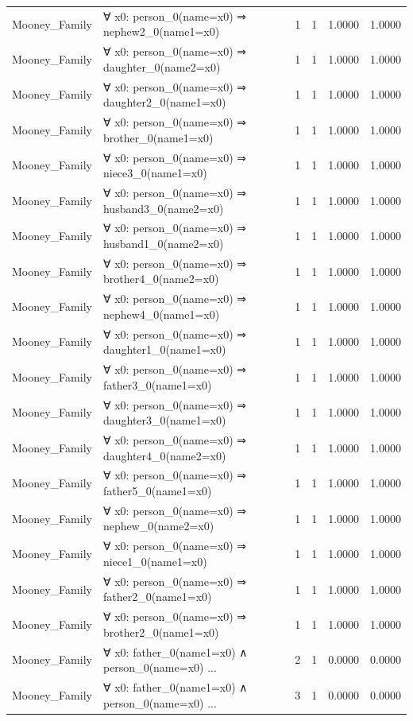 \documentclass[11pt,a4paper]{article}
\begin{document}
\begin{table}[h!]
\begin{longtable}{|l|p{6cm}|c|c|c|c|}
Mooney_Family & ∀ x0: person\_0(name=x0) ⇒ nephew2\_0(name1=x0) & 1 & 1 & 1.0000 & 1.0000 \\
Mooney_Family & ∀ x0: person\_0(name=x0) ⇒ daughter\_0(name2=x0) & 1 & 1 & 1.0000 & 1.0000 \\
Mooney_Family & ∀ x0: person\_0(name=x0) ⇒ daughter2\_0(name1=x0) & 1 & 1 & 1.0000 & 1.0000 \\
Mooney_Family & ∀ x0: person\_0(name=x0) ⇒ brother\_0(name1=x0) & 1 & 1 & 1.0000 & 1.0000 \\
Mooney_Family & ∀ x0: person\_0(name=x0) ⇒ niece3\_0(name1=x0) & 1 & 1 & 1.0000 & 1.0000 \\
Mooney_Family & ∀ x0: person\_0(name=x0) ⇒ husband3\_0(name2=x0) & 1 & 1 & 1.0000 & 1.0000 \\
Mooney_Family & ∀ x0: person\_0(name=x0) ⇒ husband1\_0(name2=x0) & 1 & 1 & 1.0000 & 1.0000 \\
Mooney_Family & ∀ x0: person\_0(name=x0) ⇒ brother4\_0(name2=x0) & 1 & 1 & 1.0000 & 1.0000 \\
Mooney_Family & ∀ x0: person\_0(name=x0) ⇒ nephew4\_0(name1=x0) & 1 & 1 & 1.0000 & 1.0000 \\
Mooney_Family & ∀ x0: person\_0(name=x0) ⇒ daughter1\_0(name1=x0) & 1 & 1 & 1.0000 & 1.0000 \\
Mooney_Family & ∀ x0: person\_0(name=x0) ⇒ father3\_0(name1=x0) & 1 & 1 & 1.0000 & 1.0000 \\
Mooney_Family & ∀ x0: person\_0(name=x0) ⇒ daughter3\_0(name1=x0) & 1 & 1 & 1.0000 & 1.0000 \\
Mooney_Family & ∀ x0: person\_0(name=x0) ⇒ daughter4\_0(name2=x0) & 1 & 1 & 1.0000 & 1.0000 \\
Mooney_Family & ∀ x0: person\_0(name=x0) ⇒ father5\_0(name1=x0) & 1 & 1 & 1.0000 & 1.0000 \\
Mooney_Family & ∀ x0: person\_0(name=x0) ⇒ nephew\_0(name2=x0) & 1 & 1 & 1.0000 & 1.0000 \\
Mooney_Family & ∀ x0: person\_0(name=x0) ⇒ niece1\_0(name1=x0) & 1 & 1 & 1.0000 & 1.0000 \\
Mooney_Family & ∀ x0: person\_0(name=x0) ⇒ father2\_0(name1=x0) & 1 & 1 & 1.0000 & 1.0000 \\
Mooney_Family & ∀ x0: person\_0(name=x0) ⇒ brother2\_0(name1=x0) & 1 & 1 & 1.0000 & 1.0000 \\
Mooney_Family & ∀ x0: father\_0(name1=x0) ∧ person\_0(name=x0) ... & 2 & 1 & 0.0000 & 0.0000 \\
Mooney_Family & ∀ x0: father\_0(name1=x0) ∧ person\_0(name=x0) ... & 3 & 1 & 0.0000 & 0.0000 \\

\end{longtable}
\end{table}
\end{document}
